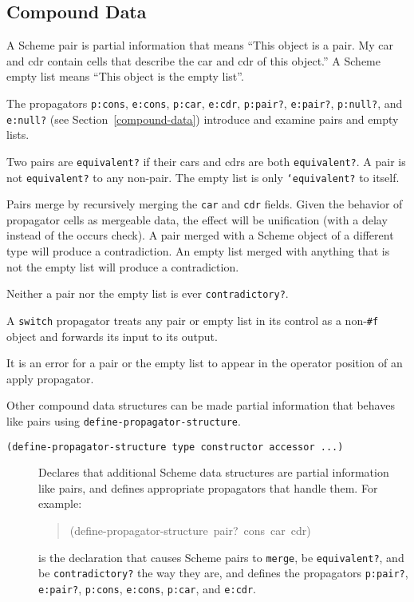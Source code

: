 \documentclass[12pt,letterpaper,english]{article}
\begin{document}
\subsection{Compound Data}
\label{id1}

A Scheme pair is partial information that means ``This object is a
pair.  My car and cdr contain cells that describe the car and cdr of
this object.''  A Scheme empty list means ``This object is the empty
list''.

The propagators \texttt{p:cons}, \texttt{e:cons}, \texttt{p:car}, \texttt{e:cdr},
\texttt{p:pair?}, \texttt{e:pair?}, \texttt{p:null?}, and \texttt{e:null?}
(see Section~\ref{compound-data})
introduce and examine pairs and empty lists.

Two pairs are \texttt{equivalent?} if their cars and cdrs are both
\texttt{equivalent?}.  A pair is not \texttt{equivalent?} to any non-pair.  The
empty list is only \texttt{`equivalent?} to itself.

Pairs merge by recursively merging the \texttt{car} and \texttt{cdr} fields.
Given the behavior of propagator cells as mergeable data, the effect
will be unification (with a delay instead of the occurs check).  A
pair merged with a Scheme object of a different type will produce a
contradiction.  An empty list merged with anything that is not the
empty list will produce a contradiction.

Neither a pair nor the empty list is ever \texttt{contradictory?}.

A \texttt{switch} propagator treats any pair or empty list in its control
as a non-\texttt{{\#}f} object and forwards its input to its output.

It is an error for a pair or the empty list to appear in the operator
position of an apply propagator.

Other compound data structures can be made partial information that
behaves like pairs using \texttt{define-propagator-structure}.
\begin{description}
\item[{\texttt{(define-propagator-structure type constructor accessor ...)}}] \leavevmode 
Declares that additional Scheme data structures are partial
information like pairs, and defines appropriate propagators
that handle them.  For example:
\begin{quote}{\ttfamily \raggedright \noindent
(define-propagator-structure~pair?~cons~car~cdr)
}\end{quote}
is the declaration that causes Scheme pairs to \texttt{merge}, be
\texttt{equivalent?}, and be \texttt{contradictory?} the way they are, and
defines the propagators \texttt{p:pair?}, \texttt{e:pair?}, \texttt{p:cons},
\texttt{e:cons}, \texttt{p:car}, and \texttt{e:cdr}.

\end{description}
\end{document}
